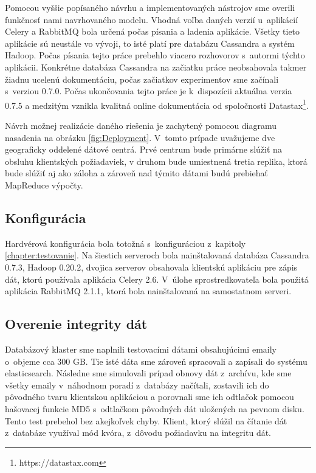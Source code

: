 \documentclass[11pt,twoside,a4paper]{book}
\begin{document}
Pomocou vyššie popísaného návrhu a implementovaných nástrojov sme overili funkčnosť nami navrhovaného modelu. Vhodná voľba daných verzií u~aplikácií Celery a RabbitMQ bola určená počas písania a ladenia aplikácie. Všetky tieto aplikácie sú neustále vo vývoji, to isté platí pre databázu Cassandra a systém Hadoop. Počas písania tejto práce prebehlo viacero rozhovorov s~autormi týchto aplikácii. Konkrétne databáza Cassandra na začiatku práce neobsahovala takmer žiadnu ucelenú dokumentáciu, počas začiatkov experimentov sme začínali s~verziou 0.7.0. Počas ukončovania tejto práce je k~dispozícii aktuálna verzia 0.7.5 a medzitým vznikla kvalitná online dokumentácia od spoločnosti Datastax\footnote{https://datastax.com}. 


Návrh možnej realizácie daného riešenia je zachytený pomocou diagramu nasadenia na obrázku \ref{fig:Deployment}. V~tomto prípade uvažujeme dve geograficky oddelené dátové centrá. Prvé centrum bude primárne slúžiť na obsluhu klientských požiadaviek, v druhom bude umiestnená tretia replika, ktorá bude slúžiť aj ako záloha a zároveň nad týmito dátami budú prebiehať MapReduce výpočty.

\subsection*{Konfigurácia}
Hardvérová konfigurácia bola totožná s~konfiguráciou z~kapitoly \ref{chapter:testovanie}. Na šiestich serveroch bola nainštalovaná databáza Cassandra 0.7.3, Hadoop 0.20.2, dvojica serverov obsahovala klientskú aplikáciu pre zápis dát, ktorú používala aplikácia Celery 2.6. V~úlohe sprostredkovateľa bola použitá aplikácia RabbitMQ 2.1.1, ktorá bola nainštalovaná na samostatnom serveri.


\subsection*{Overenie integrity dát}
Databázový klaster sme naplnili testovacími dátami obsahujúcimi emaily o~objeme cca 300 GB. Tie isté dáta sme zároveň spracovali a zapísali do systému elasticsearch. Následne sme simulovali prípad obnovy dát z~archívu, kde sme všetky emaily v~náhodnom poradí z~databázy načítali, zostavili ich do pôvodného tvaru klientskou aplikáciou a porovnali sme ich odtlačok pomocou hašovacej funkcie MD5 s~odtlačkom pôvodných dát uložených na pevnom disku. Tento test prebehol bez akejkoľvek chyby. 
Klient, ktorý slúžil na čítanie dát z~databáze využíval mód kvóra, z~dôvodu požiadavku na integritu dát.
\end{document}
